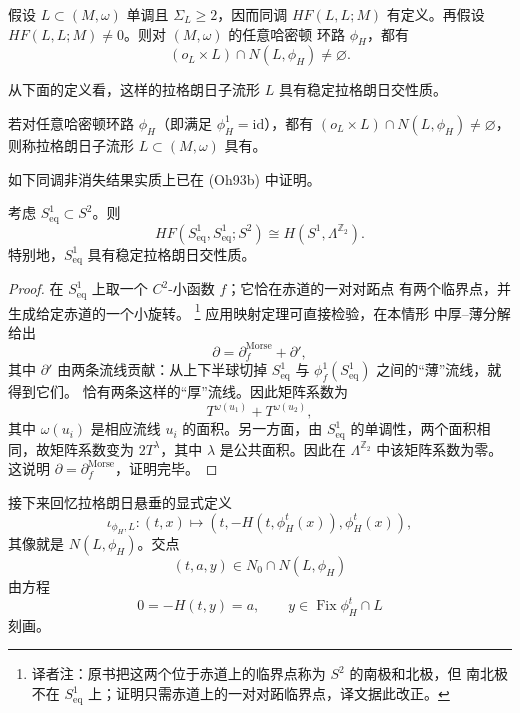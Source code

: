 \begin{corollary}
\label{cor:stable-intersection-from-HF}
假设 $L\subset(M,\omega)$ 单调且 $\Sigma_L\geq2$，因而\personFloer{}同调
$HF(L,L;M)$ 有定义。再假设 $HF(L,L;M)\neq0$。则对 $(M,\omega)$ 的任意哈密顿
环路 $\phi_H$，都有
\[
 (o_L\times L)\cap N(L,\phi_H)\neq\varnothing.
\]
\end{corollary}

从下面的定义看，这样的拉格朗日子流形 $L$ 具有稳定拉格朗日交性质。

\begin{definition}
\label{def:stable-lagrangian-intersection}
若对任意哈密顿环路 $\phi_H$（即满足 $\phi_H^1=\mathrm{id}$），都有
$(o_L\times L)\cap N(L,\phi_H)\neq\varnothing$，则称拉格朗日子流形
$L\subset(M,\omega)$ 具有\termStableLagrangianIntersectionProperty{}。
\end{definition}

如下\personFloer{}同调非消失结果实质上已在 (Oh93b) 中证明。

\begin{theorem}
\label{thm:equator-floer-nonzero}
考虑 $S_{\mathrm{eq}}^1\subset S^2$。则
\[
 HF(S_{\mathrm{eq}}^1,S_{\mathrm{eq}}^1;S^2)
 \cong H(S^1,\Lambda^{\mathbb Z_2}).
\]
特别地，$S_{\mathrm{eq}}^1$ 具有稳定拉格朗日交性质。
\end{theorem}

\begin{proof}
在 $S_{\mathrm{eq}}^1$ 上取一个 $C^2$-小\personMorse{}函数 $f$；它恰在赤道的一对对跖点
有两个临界点，并生成给定赤道的一个小旋转。
\footnote{译者注：原书把这两个位于赤道上的临界点称为 $S^2$ 的南极和北极，但
南北极不在 $S_{\mathrm{eq}}^1$ 上；证明只需赤道上的一对对跖临界点，译文据此改正。}
应用\personRiemann{}映射定理可直接检验，在本情形
中厚--薄分解给出
\[
 \partial=\partial_f^{\mathrm{Morse}}+\partial',
\]
其中 $\partial'$ 由两条\personFloer{}流线贡献：从上下半球切掉
$S_{\mathrm{eq}}^1$ 与 $\phi_f^1(S_{\mathrm{eq}}^1)$ 之间的“薄”流线，就得到它们。
恰有两条这样的“厚”流线。因此矩阵系数为
\[
 T^{\omega(u_1)}+T^{\omega(u_2)},
\]
其中 $\omega(u_i)$ 是相应\personFloer{}流线 $u_i$ 的面积。另一方面，由
$S_{\mathrm{eq}}^1$ 的单调性，两个面积相同，故矩阵系数变为 $2T^\lambda$，其中
$\lambda$ 是公共面积。因此在 $\Lambda^{\mathbb Z_2}$ 中该矩阵系数为零。这说明
$\partial=\partial_f^{\mathrm{Morse}}$，证明完毕。
\end{proof}

接下来回忆拉格朗日悬垂的显式定义
\[
 \iota_{\phi_H,L}:(t,x)\longmapsto
 (t,-H(t,\phi_H^t(x)),\phi_H^t(x)),
\]
其像就是 $N(L,\phi_H)$。交点
\[
 (t,a,y)\in N_0\cap N(L,\phi_H)
\]
由方程
\begin{equation}
 0=-H(t,y)=a,
 \qquad y\in\operatorname{Fix}\phi_H^t\cap L
\label{eq:17-suspension-intersection-characterization}
\end{equation}
刻画。

